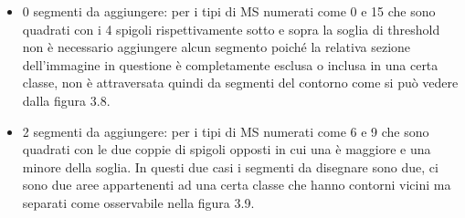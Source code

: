\documentclass[12pt,a4paper]{report}
\begin{document}
\begin{itemize}
\item 0 segmenti da aggiungere: per i tipi di MS numerati come 0 e 15 che sono quadrati con i 4 spigoli rispettivamente sotto e sopra la soglia di threshold non è necessario aggiungere alcun segmento poiché la relativa sezione dell'immagine in questione è completamente esclusa o inclusa in una certa classe,  non è attraversata quindi da segmenti del contorno come si può vedere dalla figura 3.8.
\begin{figure}[H]
\centering
\begin{floatrow}[1]
\end{floatrow}
\end{figure}
\item 2 segmenti da aggiungere: per i tipi di MS numerati come 6 e 9 che sono quadrati con le due coppie di spigoli opposti in cui una è maggiore e una minore della soglia.  In questi due casi i segmenti da disegnare sono due,  ci sono due aree appartenenti ad una certa classe che hanno contorni vicini ma separati come osservabile nella figura 3.9.
\begin{figure}[H]
\centering
\begin{floatrow}[1]
\end{floatrow}
\end{figure}


\end{itemize}
\end{document}
